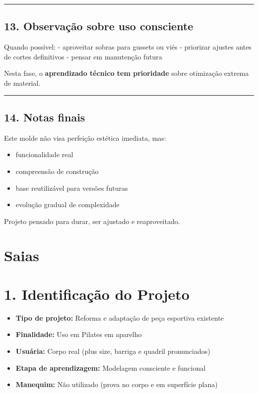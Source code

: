 \documentclass[
  10pt,oneside]{article}
\providecommand{\tightlist}{%
  \setlength{\itemsep}{0pt}\setlength{\parskip}{0pt}}
\begin{document}
\begin{center}\rule{0.5\linewidth}{0.5pt}\end{center}

\subsection{13. Observação sobre uso consciente}\label{observauxe7uxe3o-sobre-uso-consciente}

Quando possível:
- aproveitar sobras para gussets ou viés
- priorizar ajustes antes de cortes definitivos
- pensar em manutenção futura

Nesta fase, o \textbf{aprendizado técnico tem prioridade} sobre otimização extrema de material.

\begin{center}\rule{0.5\linewidth}{0.5pt}\end{center}

\subsection{14. Notas finais}\label{notas-finais}

Este molde não visa perfeição estética imediata, mas:

\begin{itemize}
\tightlist
\item
  funcionalidade real
\item
  compreensão de construção
\item
  base reutilizável para versões futuras
\item
  evolução gradual de complexidade
\end{itemize}

Projeto pensado para durar, ser ajustado e reaproveitado.

\section{Saias}\label{saias}

\section{1. Identificação do Projeto}\label{identificauxe7uxe3o-do-projeto}

\begin{itemize}
\tightlist
\item
  \textbf{Tipo de projeto:} Reforma e adaptação de peça esportiva existente\\
\item
  \textbf{Finalidade:} Uso em Pilates em aparelho\\
\item
  \textbf{Usuária:} Corpo real (plus size, barriga e quadril pronunciados)\\
\item
  \textbf{Etapa de aprendizagem:} Modelagem consciente e funcional\\
\item
  \textbf{Manequim:} Não utilizado (prova no corpo e em superfície plana)
\end{itemize}
\end{document}
